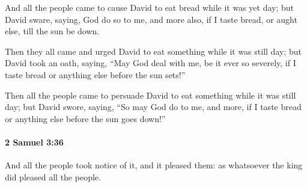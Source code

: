 			\begin{versebox}
					\item[BHS] 
					\item[ASV] And all the people came to cause David to eat bread while it was yet day; but David sware, saying, God do so to me, and more also, if I taste bread, or aught else, till the sun be down.
					\item[NIV] Then they all came and urged David to eat something while it was still day; but David took an oath, saying, “May God deal with me, be it ever so severely, if I taste bread or anything else before the sun sets!”
					\item[NRSV] Then all the people came to persuade David to eat something while it was still day; but David swore, saying, “So may God do to me, and more, if I taste bread or anything else before the sun goes down!”
			\end{versebox}

		\paragraph{2 Samuel 3:36} %
			\label{2SAMUEL-3-36}

			And all the people took notice of it, and it pleased them: as whatsoever the king did pleased all the people.

